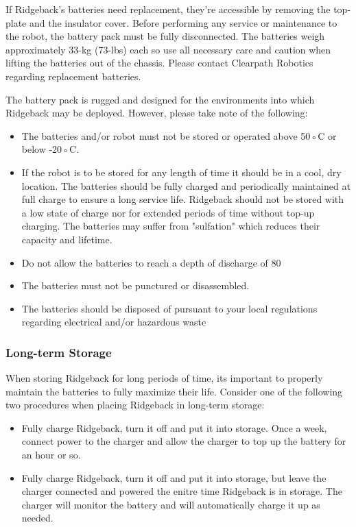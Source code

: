 \documentclass[]{clearpath-latex/clearpath-manual}
\begin{document}
If Ridgeback's batteries need replacement, they're accessible by removing the top-plate and the insulator cover. Before performing any service or maintenance to the robot, the battery pack must be fully disconnected. The batteries weigh approximately 33-kg (73-lbs) each so use all necessary care and caution when lifting the batteries out of the chassis. Please contact Clearpath Robotics regarding replacement batteries.

The battery pack is rugged and designed for the environments into which Ridgeback may be deployed. However, please take note of the following:

\begin{itemize}[nolistsep]
	\item The batteries and/or robot must not be stored or operated above 50◦C or below -20◦C.
	\item If the robot is to be stored for any length of time it should be in a cool, dry location. The batteries should be fully charged and periodically maintained at full charge to ensure a long service life. Ridgeback should not be stored with a low state of charge nor for extended periods of time without top-up charging. The batteries may suffer from "sulfation" which reduces their capacity and lifetime.
	\item Do not allow the batteries to reach a depth of discharge of 80%
	\item The batteries must not be punctured or disassembled.
	\item The batteries should be disposed of pursuant to your local regulations regarding electrical and/or hazardous waste
\end{itemize}

\subsubsection{Long-term Storage}

When storing Ridgeback for long periods of time, its important to properly maintain the batteries to fully maximize their life.  Consider one of the following two procedures when placing Ridgeback in long-term storage:

\begin{itemize}[nolistsep]
	\item Fully charge Ridgeback, turn it off and put it into storage.  Once a week, connect power to the charger and allow the charger to top up the battery for an hour or so.
	\item Fully charge Ridgeback, turn it off and put it into storage, but leave the charger connected and powered the enitre time Ridgeback is in storage.  The charger will monitor the battery and will automatically charge it up as needed.
\end{itemize}
\end{document}
